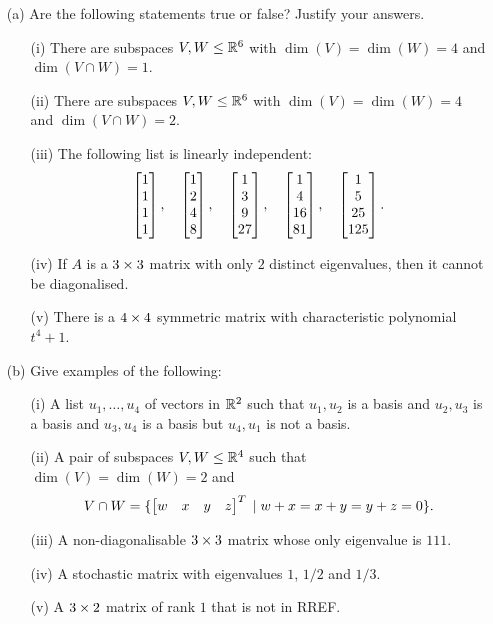 \documentclass[a4paper]{article}
\begin{document}
\begin{problem}[2013-14]
 \begin{itemize}
  \item[(a)] Are the following statements true or false?  Justify your
   answers. 
   \begin{itemize}
    \item[(i)] There are subspaces $V,W\leq{\mathbb{R}}^6$ with
     $\dim(V)=\dim(W)=4$ and $\dim(V\cap W)=1$.
    \item[(ii)] There are subspaces $V,W\leq{\mathbb{R}}^6$ with
     $\dim(V)=\dim(W)=4$ and $\dim(V\cap W)=2$.
    \item[(iii)] The following list is linearly independent:
     \[ \left[\begin{matrix} 1\\1\\ 1\\  1 \end{matrix}\right],\quad
        \left[\begin{matrix} 1\\2\\ 4\\  8 \end{matrix}\right],\quad
        \left[\begin{matrix} 1\\3\\ 9\\ 27 \end{matrix}\right],\quad
        \left[\begin{matrix} 1\\4\\16\\ 81 \end{matrix}\right],\quad
        \left[\begin{matrix} 1\\5\\25\\125 \end{matrix}\right].
     \]
    \item[(iv)] If $A$ is a $3\times 3$ matrix with only $2$ distinct
     eigenvalues, then it cannot be diagonalised.
    \item[(v)] There is a $4\times 4$ symmetric matrix with
     characteristic polynomial $t^4+1$.
   \end{itemize}
  \item[(b)] Give examples of the following: 
   \begin{itemize}
    \item[(i)] A list $u_1,\dotsc,u_4$ of vectors in ${\mathbb{R}}^2$ such that
     $u_1,u_2$ is a basis and $u_2,u_3$ is a basis and $u_3,u_4$ is a
     basis but $u_4,u_1$ is not a basis.
    \item[(ii)] A pair of subspaces $V,W\leq{\mathbb{R}}^4$ such that
     $\dim(V)=\dim(W)=2$ and 
     \[ V\cap W = \{\left[\begin{matrix} w&x&y&z\end{matrix}\right]^T \;|\; w+x=x+y=y+z=0\}. \]
    \item[(iii)] A non-diagonalisable $3\times 3$ matrix whose only
     eigenvalue is $111$.
    \item[(iv)] A stochastic matrix with eigenvalues $1$, $1/2$ and
     $1/3$. 
    \item[(v)] A $3\times 2$ matrix of rank $1$ that is not in RREF.
   \end{itemize}
 \end{itemize}
\end{problem}
\end{document}
